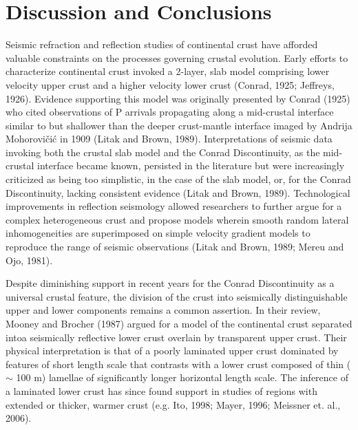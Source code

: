 \documentclass[review]{elsarticle}
\begin{document}
\section{Discussion and Conclusions}

Seismic refraction and reflection studies of continental crust have afforded valuable constraints on the processes governing crustal evolution. Early efforts to characterize continental crust invoked a 2-layer, slab model comprising lower velocity upper crust and a higher velocity lower crust (Conrad, 1925; Jeffreys, 1926). Evidence supporting this model was originally presented by Conrad (1925) who cited observations of P arrivals propagating along a mid-crustal interface similar to but shallower than the deeper crust-mantle interface imaged by Andrija Mohorovičić in 1909 (Litak and Brown, 1989). Interpretations of seismic data invoking both the crustal slab model and the Conrad Discontinuity, as the mid-crustal interface became known, persisted in the literature but were increasingly criticized as being too simplistic, in the case of the slab model, or, for the Conrad Discontinuity, lacking consistent evidence (Litak and Brown, 1989). Technological improvements in reflection seismology allowed researchers to further argue for a complex heterogeneous crust and propose models wherein smooth random lateral inhomogeneities are superimposed on simple velocity gradient models to reproduce the range of seismic observations (Litak and Brown, 1989; Mereu and Ojo, 1981).

Despite diminishing support in recent years for the Conrad Discontinuity as a universal crustal feature, the division of the crust into seismically distinguishable upper and lower components remains a common assertion. In their review, Mooney and Brocher (1987) argued for a model of the continental crust separated intoa seismically reflective lower crust overlain by transparent upper crust. Their physical interpretation is that of a poorly laminated upper crust dominated by features of short length scale that contrasts with a lower crust composed of thin ($\sim$ 100 m) lamellae of significantly longer horizontal length scale. The inference of a laminated lower crust has since found support in studies of regions with extended or thicker, warmer crust (e.g. Ito, 1998; Mayer, 1996; Meissner et. al., 2006).
\end{document}
